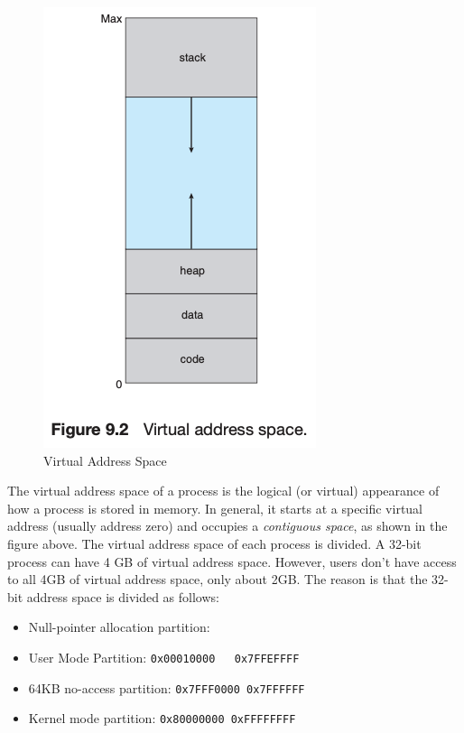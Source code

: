 \documentclass{homework}
\begin{document}
\begin{figure}[h]
\begin{center}
\includegraphics[scale=0.7]{32.png}    
\caption{Virtual Address Space}
\end{center}
\end{figure}

The virtual address space of a process is the logical (or virtual) appearance of how a process is stored in memory. In general, it starts at a specific virtual address (usually address zero) and occupies a \textit{contiguous space}, as shown in the figure above. 
The virtual address space of each process is divided. A 32-bit process can have 4 GB of virtual address space. However, users don't have access to all 4GB of virtual address space, only about 2GB. The reason is that the 32-bit address space is divided as follows:

\begin{itemize}
    \item Null-pointer allocation partition: 
    \item User Mode Partition: \texttt{0x00010000 ~ 0x7FFEFFFF}
    \item 64KB no-access partition: \texttt{0x7FFF0000~0x7FFFFFF}
    \item Kernel mode partition: \texttt{0x80000000~0xFFFFFFFF}
\end{itemize}
\end{document}

